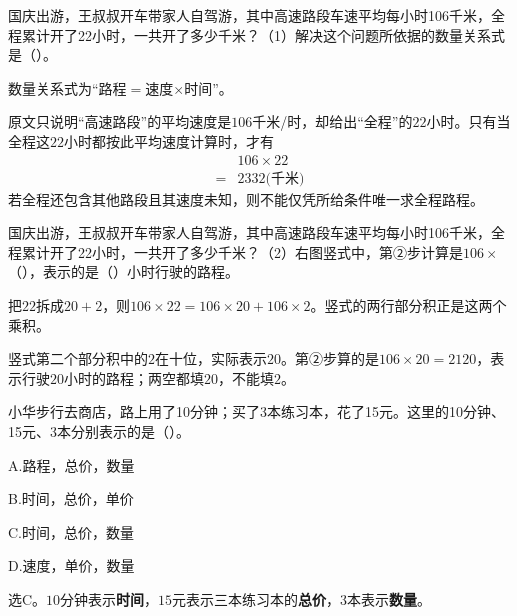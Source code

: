 国庆出游，王叔叔开车带家人自驾游，其中高速路段车速平均每小时106千米，全程累计开了22小时，一共开了多少千米？（1）解决这个问题所依据的数量关系式是（\hspace{1.8em}）。\par
\begin{BookAnswer}
数量关系式为“路程\(=\)速度\(\times\)时间”。\par 原文只说明“高速路段”的平均速度是\(106\)千米/时，却给出“全程”的\(22\)小时。只有当全程这\(22\)小时都按此平均速度计算时，才有\[\begin{aligned}&106\times22\\={}&2332\text{(千米)}\end{aligned}\]若全程还包含其他路段且其速度未知，则不能仅凭所给条件唯一求全程路程。
\end{BookAnswer}

国庆出游，王叔叔开车带家人自驾游，其中高速路段车速平均每小时106千米，全程累计开了22小时，一共开了多少千米？（2）右图竖式中，第②步计算是\(106\times\)（\hspace{1.8em}），表示的是（\hspace{1.8em}）小时行驶的路程。\par
{}
\begin{BookAnswer}
把\(22\)拆成\(20+2\)，则\(106\times22=106\times20+106\times2\)。竖式的两行部分积正是这两个乘积。\par 竖式第二个部分积中的\(2\)在十位，实际表示\(20\)。第②步算的是\(106\times20=2120\)，表示行驶\(20\)小时的路程；两空都填\(20\)，不能填\(2\)。
\end{BookAnswer}

小华步行去商店，路上用了10分钟；买了3本练习本，花了15元。这里的10分钟、15元、3本分别表示的是（\hspace{1.8em}）。\par
\noindent A.路程，总价，数量\par
\noindent B.时间，总价，单价\par
\noindent C.时间，总价，数量\par
\noindent D.速度，单价，数量\par
\begin{BookAnswer}
选\(\mathrm C\)。\(10\)分钟表示\textbf{时间}，\allowbreak{}\(15\)元表示三本练习本的\textbf{总价}，\allowbreak{}\(3\)本表示\textbf{数量}。
\end{BookAnswer}

